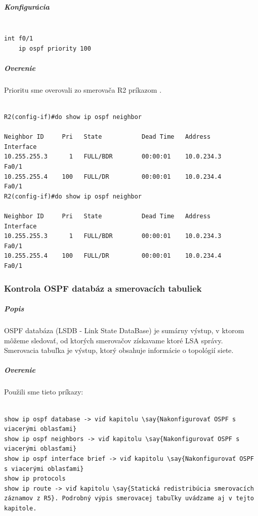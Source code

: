 \documentclass[12pt,twoside,a4paper]{article}
\begin{document}
\subparagraph{Konfigurácia}
\noindent
{\selectfont
\begin{small}
\begin{verbatim}

int f0/1
    ip ospf priority 100

\end{verbatim}
\end{small}
}

\subparagraph{Overenie}
\subparagraph{}
Prioritu sme overovali zo smerovača R2 príkazom .

\noindent
{\selectfont
\begin{small}
\begin{verbatim}

R2(config-if)#do show ip ospf neighbor

Neighbor ID     Pri   State           Dead Time   Address         Interface
10.255.255.3      1   FULL/BDR        00:00:01    10.0.234.3      Fa0/1
10.255.255.4    100   FULL/DR         00:00:01    10.0.234.4      Fa0/1
R2(config-if)#do show ip ospf neighbor

Neighbor ID     Pri   State           Dead Time   Address         Interface
10.255.255.3      1   FULL/BDR        00:00:01    10.0.234.3      Fa0/1
10.255.255.4    100   FULL/DR         00:00:01    10.0.234.4      Fa0/1

\end{verbatim}
\end{small}
}


\subsubsection*{Kontrola OSPF databáz a smerovacích tabuliek}
\subparagraph{Popis}
\subparagraph{}
OSPF databáza (LSDB - Link State DataBase) je sumárny výstup, v ktorom môžeme sledovať, od ktorých smerovačov získavame ktoré LSA správy. Smerovacia tabuľka je výstup, ktorý obsahuje informácie o topológií siete.

\subparagraph{Overenie}
\subparagraph{}
Použili sme tieto príkazy:

\noindent
{\selectfont
\begin{small}
\begin{verbatim}

show ip ospf database -> viď kapitolu \say{Nakonfigurovať OSPF s viacerými oblasťami}
show ip ospf neighbors -> viď kapitolu \say{Nakonfigurovať OSPF s viacerými oblasťami}
show ip ospf interface brief -> viď kapitolu \say{Nakonfigurovať OSPF s viacerými oblasťami}
show ip protocols
show ip route -> viď kapitolu \say{Statická redistribúcia smerovacích záznamov z R5}. Podrobný výpis smerovacej tabuľky uvádzame aj v tejto kapitole.

\end{verbatim}
\end{small}
}
\end{document}
